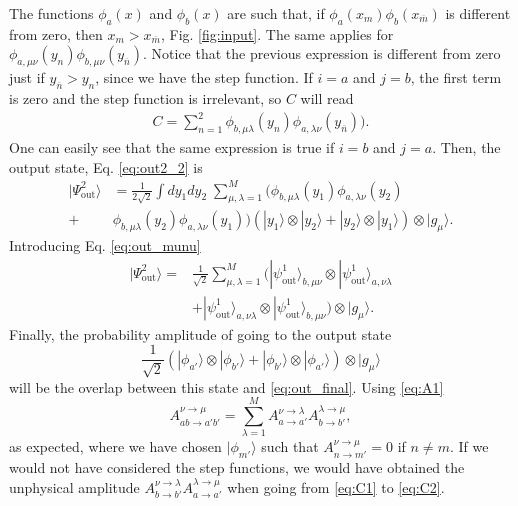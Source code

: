 \documentclass[notitlepage, prx, preprint, amsmath,superscriptaddress,amssymb]{revtex4-1}
\begin{document}
The functions $\phi_a(x)$ and $\phi_b(x)$ are such that, if $\phi_a(x_m)\phi_b(x_{\overline{m}})$ is different from zero, then $x_m>x_{\overline{m}}$, Fig. \ref{fig:input}. The same applies for $\phi_{a,\mu\nu}(y_n)\phi_{b,\mu\nu}(y_{\overline{n}})$. Notice that the previous expression is different from zero just if $y_{\overline{n}}>y_n$, since we have the step function. If $i=a$ and $j=b$, the first term is zero and the step function is irrelevant, so $C$ will read
\begin{align}\label{eq:C2}
C=\sum_{n=1}^2\phi_{b,\mu\lambda}(y_n)\phi_{a,\lambda\nu}(y_{\overline{n}})).
\end{align}
One can easily see that the same expression is true if $i=b$ and $j=a$. Then, the output state, Eq. \eqref{eq:out2_2} is
\begin{align}
|\Psi_\text{out}^2\rangle &=\frac{1}{2\sqrt{2}}\int dy_1dy_2\;\sum_{\mu,\lambda=1}^M(\phi_{b,\mu\lambda}(y_1)\phi_{a,\lambda\nu}(y_2)\nonumber\\
+&\phi_{b,\mu\lambda}(y_2)\phi_{a,\lambda\nu}(y_1))(|y_1\rangle\otimes|y_2\rangle + |y_2\rangle\otimes|y_1\rangle)\otimes|g_\mu\rangle.
\end{align}
Introducing Eq. \eqref{eq:out_munu}
\begin{align}\label{eq:out_final}
|\Psi_\text{out}^2\rangle =&\frac{1}{\sqrt{2}}\sum_{\mu,\lambda=1}^M(|\psi_\text{out}^1\rangle_{b,\mu\nu}\otimes|\psi_\text{out}^1\rangle_{a,\nu\lambda}  \nonumber\\
& + |\psi_\text{out}^1\rangle_{a,\nu\lambda}\otimes|\psi_\text{out}^1\rangle_{b,\mu\nu})\otimes|g_\mu\rangle.
\end{align}
Finally, the probability amplitude of going to the output state
\begin{equation}
\frac{1}{\sqrt{2}}(|\phi_{a'}\rangle\otimes|\phi_{b'}\rangle+|\phi_{b'}\rangle\otimes|\phi_{a'}\rangle)\otimes|g_\mu\rangle
\end{equation}
will be the overlap between this state and \eqref{eq:out_final}. Using \eqref{eq:A1}
\begin{equation}
A_{ab\to a'b'}^{\nu\to\mu}=\sum_{\lambda=1}^M A_{a\to a'}^{\nu\to\lambda} A_{b\to b'}^{\lambda\to\mu},
\end{equation}
as expected, where we have chosen $|\phi_{m'}\rangle$ such that $A_{n\to m'}^{\nu\to \mu}=0$ if $n\neq m$. If we would not have considered the step functions, we would have obtained the unphysical amplitude $A_{b\to b'}^{\nu\to\lambda} A_{a\to a'}^{\lambda\to\mu}$ when going from \eqref{eq:C1} to \eqref{eq:C2}.
\end{document}
